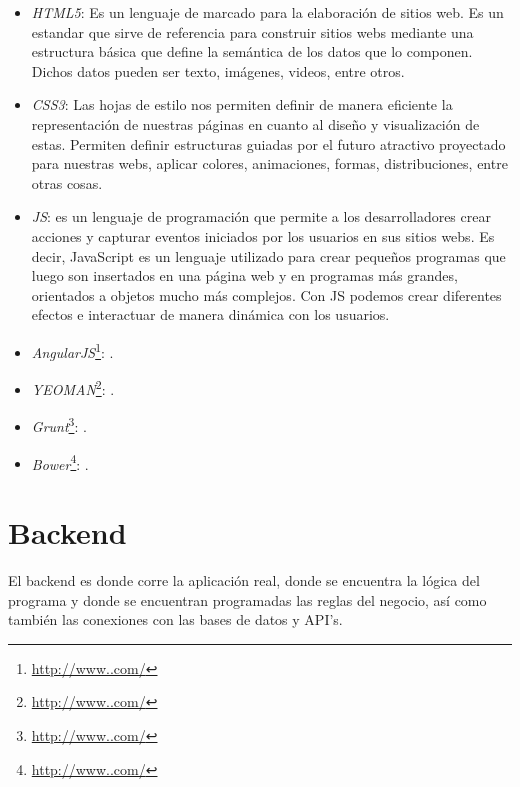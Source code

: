 \documentclass[oneside]{book}
\begin{document}
	\begin{itemize}
	\renewcommand{\labelitemi}{\scriptsize\tiny$\blacksquare$} 
	\itemsep=7pt \topsep=0pt \partopsep=0pt \parskip=0pt \parsep=0pt

		\item \textit{HTML5}: Es un lenguaje de marcado para la elaboración de sitios web. Es un estandar que sirve de referencia para construir sitios webs mediante una estructura básica que define la semántica de los datos que lo componen. Dichos datos pueden ser texto, imágenes, videos, entre otros.
		
		\item \textit{CSS3}: Las hojas de estilo nos permiten definir de manera eficiente la representación de nuestras páginas en cuanto al diseño y visualización de estas. Permiten definir estructuras guiadas por el futuro atractivo proyectado para nuestras webs, aplicar colores, animaciones, formas, distribuciones, entre otras cosas.

		\item \textit{JS}: es un lenguaje de programación que permite a los desarrolladores crear acciones y capturar eventos iniciados por los usuarios en sus sitios webs. Es decir, JavaScript es un lenguaje utilizado para crear pequeños programas que luego son insertados en una página web y en programas más grandes, orientados a objetos mucho más complejos. Con JS podemos crear diferentes efectos e interactuar de manera dinámica con los usuarios.
		
		\item \textit{AngularJS}\footnote{\url{http://www..com/}}: .
		
		\item \textit{YEOMAN}\footnote{\url{http://www..com/}}: .

		\item \textit{Grunt}\footnote{\url{http://www..com/}}: .

		\item \textit{Bower}\footnote{\url{http://www..com/}}: .

	\end{itemize}
	
\newpage


\section{Backend}
	El backend es donde corre la aplicaci\'{o}n real, donde se encuentra la l\'{o}gica del programa y donde se encuentran programadas las reglas del negocio, as\'{i} como tambi\'{e}n las conexiones con las bases de datos y API's.
	
\end{document}
